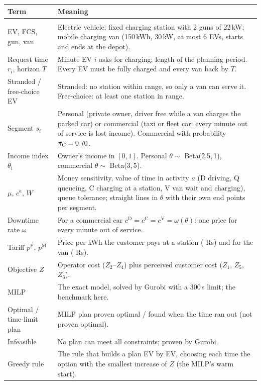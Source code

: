 \begin{xltabular}{\textwidth}{@{}>{\raggedright\arraybackslash}p{4.0cm}X@{}}
\toprule
\textbf{Term} & \textbf{Meaning} \\
\midrule
\endhead
{} \\
EV, FCS, gun, van & Electric vehicle; fixed charging station with 2 guns of 22\,kW; mobile charging van (150\,kWh, 30\,kW, at most 6 EVs, starts and ends at the depot). \\
Request time $r_i$, horizon $T$ & Minute EV $i$ asks for charging; length of the planning period. Every EV must be fully charged and every van back by $T$. \\
Stranded / free-choice EV & Stranded: no station within range, so only a van can serve it. Free-choice: at least one station in range. \\
Segment $s_i$ & Personal (private owner, driver free while a van charges the parked car) or commercial (taxi or fleet car: every minute out of service is lost income). Commercial with probability $\pi_{\mathrm C}=0.70$. \\
Income index $\theta_i$ & Owner's income in $[0,1]$. Personal $\theta\sim$ Beta(2.5,\,1), commercial $\theta\sim$ Beta(3,\,5). \\
$\mu$, $c^{a}$, $W$ & Money sensitivity, value of time in activity $a$ (D driving, Q queueing, C charging at a station, V van wait and charging), queue tolerance; straight lines in $\theta$ with their own end points per segment. \\
Downtime rate $\omega$ & For a commercial car $c^{\mathrm D}=c^{\mathrm C}=c^{\mathrm V}=\omega(\theta)$: one price for every minute out of service. \\
Tariff $p^{\mathrm F}$, $p^{\mathrm M}$ & Price per kWh the customer pays at a station (\TariffF{} Rs) and for the van (\TariffM{} Rs). \\
Objective $Z$ & Operator cost ($Z_2$--$Z_4$) plus perceived customer cost ($Z_1$, $Z_5$, $Z_6$). \\
MILP & The exact model, solved by Gurobi with a 300\,s limit; the benchmark here. \\
Optimal / time-limit plan & MILP plan proven optimal / found when the time ran out (not proven optimal). \\
Infeasible & No plan can meet all constraints; proven by Gurobi. \\
Greedy rule & The rule that builds a plan EV by EV, choosing each time the option with the smallest increase of $Z$ (the MILP's warm start). \\

\end{xltabular}
